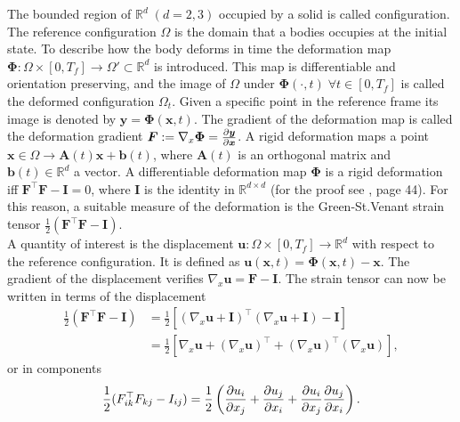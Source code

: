 The bounded region of $\mathbb{R}^d \; (d=2, 3)$ occupied by a solid is called configuration. The reference configuration $\Omega$ is the domain that a bodies occupies at the initial state. To describe how the body deforms in time the deformation map $\bm\Phi: \Omega \times [0, T_f] \rightarrow \Omega' \subset \mathbb{R}^d$ is introduced. This map is differentiable and orientation preserving, and the image of $\Omega$ under $\bm\Phi(\cdot, t) \; \forall t \in [0, T_f]$ is called the deformed configuration $\Omega_t$. Given a specific point in the reference frame its image is denoted by $\bm{y} = \bm{\Phi}(\bm{x}, t)$. The gradient of the deformation map is called the deformation gradient $\bm{F}:=\nabla_x\bm{\Phi} = \diffp{\bm{y}}{\bm{x}}$. A rigid deformation maps a point $\bm{x} \in \Omega \rightarrow \bm{A}(t) \bm{x} + \bm{b}(t)$, where $\bm{A}(t)$ is an orthogonal matrix and $\bm{b}(t) \in \mathbb{R}^d$ a vector. A differentiable deformation map $\bm\Phi$ is a rigid deformation iff $\bm{F}^\top \bm{F} - \bm{I} = 0$,  where $\bm{I}$ is the identity in $\mathbb{R}^{d\times d}$ (for the proof see \cite{ciarlet1988mathematical}, page 44). For this reason, a suitable measure of the deformation is the Green-St.Venant strain tensor $\frac{1}{2} (\bm{F}^\top \bm{F} - \bm{I})$.  \\
A quantity of interest is the displacement $\bm{u}: \Omega \times [0, T_f] \rightarrow \mathbb{R}^d$ with respect to the reference configuration. It is defined as $\bm{u}(\bm{x}, t) = \bm{\Phi}(\bm{x}, t) - \bm{x}$. The gradient of the displacement verifies $\nabla_x \bm{u} = \bm{F} - \bm{I}$. The strain tensor can now be written in terms of the displacement
\begin{equation*}
\begin{aligned}
\frac{1}{2} (\bm{F}^\top \bm{F} - \bm{I}) &= \frac{1}{2}\left[(\nabla_x \bm{u} + \bm{I})^\top (\nabla_x \bm{u} + \bm{I}) - \bm{I}\right] \\
&= \frac{1}{2}\left[\nabla_x \bm{u} + (\nabla_x \bm{u})^\top + (\nabla_x \bm{u})^\top (\nabla_x \bm{u})\right],
\end{aligned}
\end{equation*}
or in components 
\begin{equation*}
\frac{1}{2} ({F}_{ik}^\top {F}_{kj} - {I}_{ij}) = \frac{1}{2} \left(\diffp{u_i}{x_j} + \diffp{u_j}{x_i} + \diffp{u_i}{x_j}\diffp{u_j}{x_i}\right).
\end{equation*}

